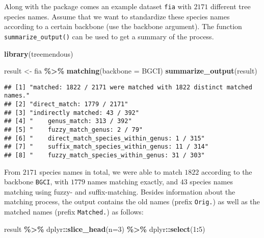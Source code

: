 \documentclass[
  11pt,
]{article}
\newenvironment{Shaded}{\begin{snugshade}}{\end{snugshade}}
\newcommand{\AttributeTok}[1]{\textcolor[rgb]{0.13,0.29,0.53}{#1}}
\newcommand{\DecValTok}[1]{\textcolor[rgb]{0.00,0.00,0.81}{#1}}
\newcommand{\FunctionTok}[1]{\textcolor[rgb]{0.13,0.29,0.53}{\textbf{#1}}}
\newcommand{\NormalTok}[1]{#1}
\newcommand{\OtherTok}[1]{\textcolor[rgb]{0.56,0.35,0.01}{#1}}
\newcommand{\SpecialCharTok}[1]{\textcolor[rgb]{0.81,0.36,0.00}{\textbf{#1}}}
\newcommand{\StringTok}[1]{\textcolor[rgb]{0.31,0.60,0.02}{#1}}
\begin{document}
Along with the package comes an example dataset \verb|fia| with \(2171\)
different tree species names. Assume that we want to standardize these
species names according to a certain backbone (use the backbone
argument). The function \verb|summarize_output()| can be used to get a
summary of the process.

\begin{Shaded}
\begin{Highlighting}[]
\FunctionTok{library}\NormalTok{(treemendous)}
\end{Highlighting}
\end{Shaded}

\begin{Shaded}
\begin{Highlighting}[]
\NormalTok{result }\OtherTok{\textless{}{-}}\NormalTok{ fia }\SpecialCharTok{\%\textgreater{}\%} \FunctionTok{matching}\NormalTok{(}\AttributeTok{backbone =} \StringTok{\textquotesingle{}BGCI\textquotesingle{}}\NormalTok{)}
\FunctionTok{summarize\_output}\NormalTok{(result)}
\end{Highlighting}
\end{Shaded}

\begin{verbatim}
## [1] "matched: 1822 / 2171 were matched with 1822 distinct matched names."
## [2] "direct_match: 1779 / 2171"                                          
## [3] "indirectly matched: 43 / 392"                                       
## [4] "    genus_match: 313 / 392"                                         
## [5] "    fuzzy_match_genus: 2 / 79"                                      
## [6] "    direct_match_species_within_genus: 1 / 315"                     
## [7] "    suffix_match_species_within_genus: 11 / 314"                    
## [8] "    fuzzy_match_species_within_genus: 31 / 303"
\end{verbatim}

\noindent From \(2171\) species names in total, we were able to match
\(1822\) according to the backbone \verb|BGCI|, with \(1779\) names
matching exactly, and \(43\) species names matching using fuzzy- and
suffix-matching. Besides information about the matching process, the
output contains the old names (prefix \verb|Orig.|) as well as the
matched names (prefix \verb|Matched.|) as follows:

\begin{Shaded}
\begin{Highlighting}[]
\NormalTok{result }\SpecialCharTok{\%\textgreater{}\%} 
\NormalTok{  dplyr}\SpecialCharTok{::}\FunctionTok{slice\_head}\NormalTok{(}\AttributeTok{n=}\DecValTok{3}\NormalTok{) }\SpecialCharTok{\%\textgreater{}\%}
\NormalTok{  dplyr}\SpecialCharTok{::}\FunctionTok{select}\NormalTok{(}\DecValTok{1}\SpecialCharTok{:}\DecValTok{5}\NormalTok{)}
\end{Highlighting}
\end{Shaded}
\end{document}
